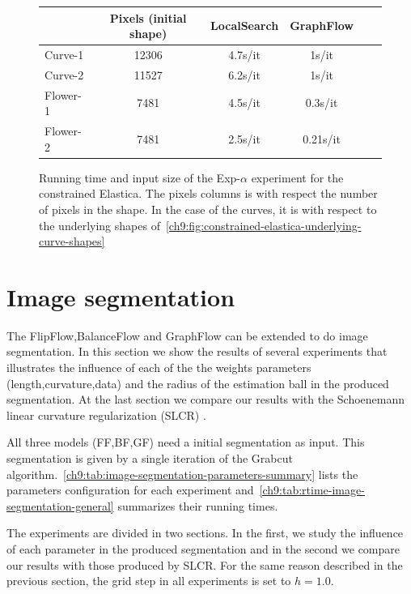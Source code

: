 \begin{figure}
\center
\captionsetup{type=table}
\begin{tabular}{|l|c|c|c|c|c|}
\hline
& Pixels (initial shape) & LocalSearch & GraphFlow \\
\hline
Curve-1 & 12306 & 4.7s/it & 1s/it\\
Curve-2 & 11527 & 6.2s/it & 1s/it\\
Flower-1  & 7481 & 4.5s/it & 0.3s/it \\
Flower-2 & 7481 & 2.5s/it & 0.21s/it\\
\hline
\end{tabular}
\caption{Running time and input size of the Exp-$\alpha$ experiment for the constrained Elastica. The pixels columns is with respect the number of pixels in the shape. In the case of the curves, it is with respect to the underlying shapes of~\cref{ch9:fig:constrained-elastica-underlying-curve-shapes}}
\label{ch9:tab:rtime-constrained-elastica-general} 
\end{figure}


\section{Image segmentation}

The FlipFlow,BalanceFlow and GraphFlow can be extended to do image segmentation. In this section we show the results of several experiments that illustrates the influence of each of the the weights parameters (length,curvature,data) and the radius of the estimation ball in the produced segmentation. At the last section we compare our results with the Schoenemann linear curvature regularization (SLCR) \cite{schoenemann09linear}. 

All three models (FF,BF,GF) need a initial segmentation as input. This segmentation is given by a single iteration of the Grabcut algorithm.~\cref{ch9:tab:image-segmentation-parameters-summary} lists the parameters configuration for each experiment and~\cref{ch9:tab:rtime-image-segmentation-general} summarizes their running times. 

The experiments are divided in two sections. In the first, we study the influence of each parameter in the produced segmentation and in the second we compare our results with those produced by SLCR. For the same reason described in the previous section, the grid step in all experiments is set to $h=1.0$.


